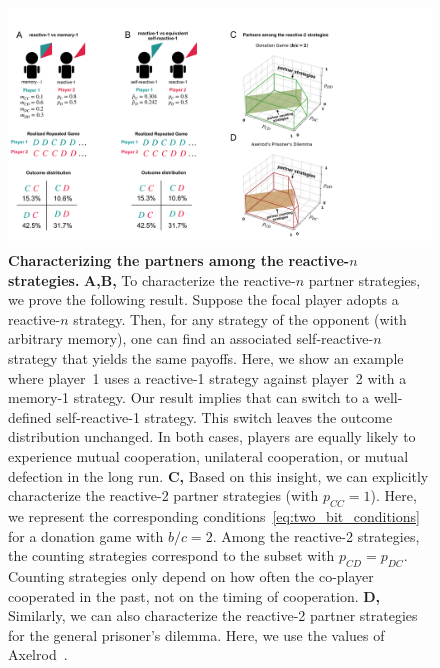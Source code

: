 \documentclass[9pt,twocolumn,twoside]{pnas-new}
\begin{document}
\begin{figure}[t]
       \centering
       \includegraphics[width=.8\textwidth]{../../figures/conceptual_figure_results.pdf}
       \caption{
       \textbf{Characterizing the partners among the reactive-$n$ strategies.} 
       {\bf A,B,} To characterize the reactive-$n$ partner strategies, we prove the following result. 
       Suppose the focal player adopts a reactive-$n$ strategy. 
       Then, for any strategy of the opponent (with arbitrary memory), one can find an associated self-reactive-$n$ strategy that yields the same payoffs. 
       Here, we show an example where player~1 uses a reactive-1 strategy against player~2 with a memory-1 strategy. 
       Our result implies that can switch to a well-defined self-reactive-1 strategy. 
       This switch leaves the outcome distribution unchanged.
       In both cases, players are equally likely to experience mutual cooperation, unilateral cooperation, or mutual defection in the long run. 
       \textbf{C,} Based on this insight, we can explicitly characterize the reactive-2 partner strategies (with $p_{CC}\!=\!1$). 
       Here, we represent the corresponding conditions~\eqref{eq:two_bit_conditions} for a donation game with $b/c\!=\!2$. 
       Among the reactive-2 strategies, the counting strategies correspond to the subset with $p_{CD}\!=\!p_{DC}$. 
       Counting strategies only depend on how often the co-player cooperated in the past, not on the timing of cooperation.
       \textbf{D,} Similarly, we can also characterize the reactive-2 partner strategies for the general prisoner's dilemma. 
       Here, we use the values of Axelrod~\citep{axelrod:AAAS:1981}.
       }\label{fig:conceptual_figure_results}
\end{figure}

\end{document}
